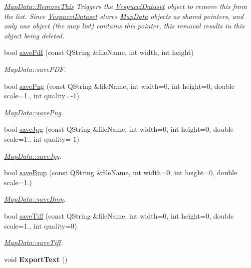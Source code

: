 \begin{DoxyCompactItemize}
\begin{DoxyCompactList}\small\item\em \hyperlink{class_map_data_aa98f0fec1e13eab7858dce7b7fe31561}{Map\+Data\+::\+Remove\+This} Triggers the \hyperlink{class_vespucci_dataset}{Vespucci\+Dataset} object to remove this from the list. Since \hyperlink{class_vespucci_dataset}{Vespucci\+Dataset} stores \hyperlink{class_map_data}{Map\+Data} objects as shared pointers, and only one object (the map list) contains this pointer, this removal results in this object being deleted. \end{DoxyCompactList}\item 
bool \hyperlink{class_map_data_aecfef074535f5fa0586a94125782411a}{save\+Pdf} (const Q\+String \&file\+Name, int width, int height)
\begin{DoxyCompactList}\small\item\em Map\+Data\+::save\+P\+DF. \end{DoxyCompactList}\item 
bool \hyperlink{class_map_data_a6bcf8d8f2d6e06079565517934bd24e5}{save\+Png} (const Q\+String \&file\+Name, int width=0, int height=0, double scale=1., int quality=-\/1)
\begin{DoxyCompactList}\small\item\em \hyperlink{class_map_data_a6bcf8d8f2d6e06079565517934bd24e5}{Map\+Data\+::save\+Png}. \end{DoxyCompactList}\item 
bool \hyperlink{class_map_data_a79f4f199f916d9dbd8368a27070ea3c4}{save\+Jpg} (const Q\+String \&file\+Name, int width=0, int height=0, double scale=1., int quality=-\/1)
\begin{DoxyCompactList}\small\item\em \hyperlink{class_map_data_a79f4f199f916d9dbd8368a27070ea3c4}{Map\+Data\+::save\+Jpg}. \end{DoxyCompactList}\item 
bool \hyperlink{class_map_data_ae913ad8de2631267f8eb7f56a8c7682b}{save\+Bmp} (const Q\+String \&file\+Name, int width=0, int height=0, double scale=1.)
\begin{DoxyCompactList}\small\item\em \hyperlink{class_map_data_ae913ad8de2631267f8eb7f56a8c7682b}{Map\+Data\+::save\+Bmp}. \end{DoxyCompactList}\item 
bool \hyperlink{class_map_data_a4c90d0715c7591975e439d54a4a88e6d}{save\+Tiff} (const Q\+String \&file\+Name, int width=0, int height=0, double scale=1., int quality=0)
\begin{DoxyCompactList}\small\item\em \hyperlink{class_map_data_a4c90d0715c7591975e439d54a4a88e6d}{Map\+Data\+::save\+Tiff}. \end{DoxyCompactList}\item 
void {\bfseries Export\+Text} ()\hypertarget{class_map_data_ad7ad56bbfe5c466c1d29df04567a34f3}{}\label{class_map_data_ad7ad56bbfe5c466c1d29df04567a34f3}


\end{DoxyCompactItemize}
